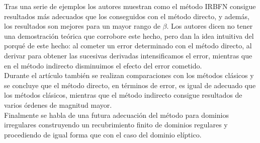 \documentclass[12pt]{article}       %
\begin{document}
Tras una serie de ejemplos los autores muestran como el método IRBFN consigue resultados más adecuados que los conseguidos con el método directo, y además, los resultados son mejores para un mayor rango de $\beta$. Los autores dicen no tener una demostración teórica que corrobore este hecho, pero dan la idea intuitiva del porqué de este hecho: al cometer un error determinado con el método directo, al derivar para obtener las sucesivas derivadas intensificamos el error, mientras que en el método indirecto disminuimos el efecto del error cometido.\\%

Durante el artículo también se realizan comparaciones con los métodos clásicos y se concluye que el método directo, en términos de error, es igual de adecuado que los métodos clásicos, mientras que el método indirecto consigue resultados de varios órdenes de magnitud mayor.\\

Finalmente se habla de una futura adecuación del método para dominios irregulares construyendo un recubrimiento finito de dominios regulares y procediendo de igual forma que con el caso del dominio elíptico.\\
\end{document}
